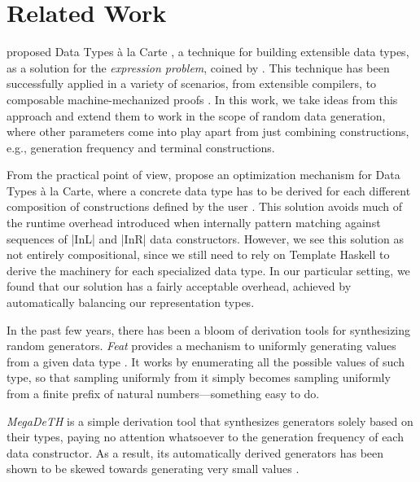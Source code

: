 \section{Related Work}
\label{sec:related}

\citeauthor{SwierstraDTC} proposed Data Types \`a la Carte \cite{SwierstraDTC},
a technique for building extensible data types, as a solution for the
\emph{expression problem}, coined by \citeauthor{wadler1998expression}
\cite{wadler1998expression}.
%
This technique has been successfully applied in a variety of scenarios, from
extensible compilers, to composable machine-mechanized proofs
\cite{Day:2013:CAL:2620678.2620680, persson2011generic, wu2014effect,
  delaware2013meta}.
%
In this work, we take ideas from this approach and extend them to work in the
scope of random data generation, where other parameters come into play apart
from just combining constructions, e.g., generation frequency and terminal
constructions.


From the practical point of view, \citeauthor{KiriyamaOptimizingDTC} propose an
optimization mechanism for Data Types \`a la Carte, where a concrete data type
has to be derived for each different composition of constructions defined by the
user \cite{KiriyamaOptimizingDTC}.
%
This solution avoids much of the runtime overhead introduced when internally
pattern matching against sequences of |InL| and |InR| data constructors.
%
However, we see this solution as not entirely compositional, since we still need
to rely on Template Haskell to derive the machinery for each specialized data
type.
%
In our particular setting, we found that our solution has a fairly acceptable
overhead, achieved by automatically balancing our representation types.


In the past few years, there has been a bloom of derivation tools for
synthesizing random generators.
%
\emph{Feat} provides a mechanism to uniformly generating values from a given
data type \cite{DuregardJW12}.
%
It works by enumerating all the possible values of such type, so that sampling
uniformly from it simply becomes sampling uniformly from a finite prefix of
natural numbers---something easy to do.


\emph{MegaDeTH} is a simple derivation tool that synthesizes generators solely
based on their types, paying no attention whatsoever to the generation frequency
of each data constructor.
%
As a result, its automatically derived generators has been shown to be skewed
towards generating very small values
\cite{DBLP:conf/haskell/MistaRH18}.


